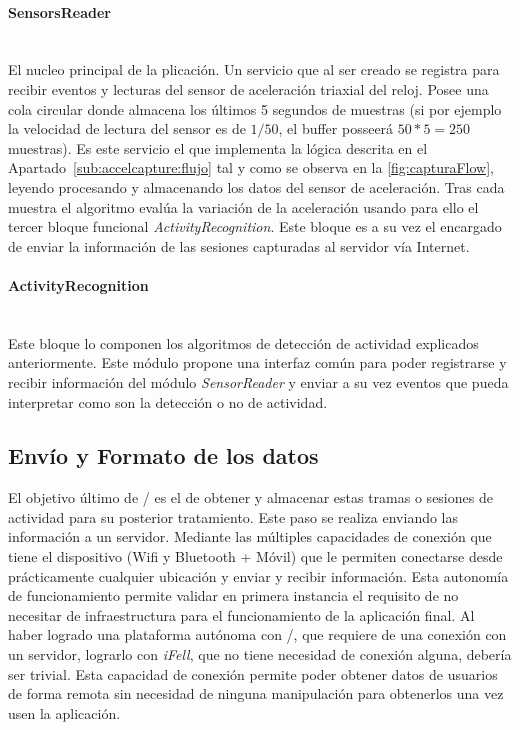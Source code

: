 \paragraph{SensorsReader}\\
El nucleo principal de la plicación. Un servicio que al ser creado se registra para recibir eventos y lecturas del sensor de aceleración triaxial del reloj. Posee una cola circular donde almacena los últimos 5 segundos de muestras (si por ejemplo la velocidad de lectura del sensor es de $1/50$, el buffer posseerá $50 * 5 = 250$ muestras).
Es este servicio el que implementa la lógica descrita en el Apartado~\ref{sub:accelcapture:flujo} tal y como se observa en la \autoref{fig:capturaFlow}, leyendo procesando y almacenando los datos del sensor de aceleración. Tras cada muestra el algoritmo evalúa la variación de la aceleración usando para ello el tercer bloque funcional \textit{ActivityRecognition}. Este bloque es a su vez el encargado de enviar la información de las sesiones capturadas al servidor vía Internet.

\paragraph{ActivityRecognition}\\
Este bloque lo componen los algoritmos de detección de actividad explicados anteriormente. Este módulo propone una interfaz común para poder registrarse y recibir información del módulo \textit{SensorReader} y enviar a su vez eventos que pueda interpretar como son la detección o no de actividad.


\subsection{Envío y Formato de los datos}\label{sub:accelcapture:red}

El objetivo último de \accelcapture/ es el de obtener y almacenar estas tramas o sesiones de actividad para su posterior tratamiento. Este paso se realiza enviando las información a un servidor. Mediante las múltiples capacidades de conexión que tiene el dispositivo (Wifi y Bluetooth + Móvil) que le permiten conectarse desde prácticamente cualquier ubicación y enviar y recibir información. Esta autonomía de funcionamiento permite validar en primera instancia el requisito de no necesitar de infraestructura para el funcionamiento de la aplicación final. Al haber logrado una plataforma autónoma con \accelcapture/, que requiere de una conexión con un servidor, lograrlo con \textit{iFell}, que no tiene necesidad de conexión alguna, debería ser trivial. Esta capacidad de conexión permite poder obtener datos de usuarios de forma remota sin necesidad de ninguna manipulación para obtenerlos una vez usen la aplicación.

